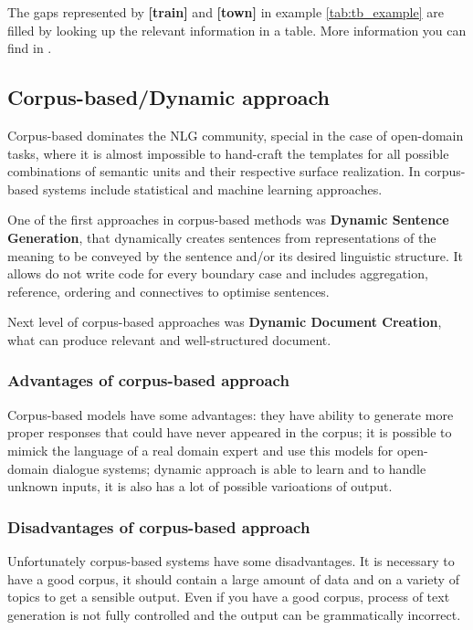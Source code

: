 The gaps represented by \textbf{[train]} and \textbf{[town]} in example \ref{tab:tb_example} are filled by looking up the relevant
information in a table. More information you can find in \cite{applied_nlg}.

\subsection{Corpus-based/Dynamic approach}
Corpus-based dominates the NLG community, special in the case of open-domain tasks, where it is almost impossible to hand-craft the templates for all possible combinations of semantic units and their respective surface realization.
In corpus-based systems include statistical and machine learning approaches. 

One of the first approaches in corpus-based methods was \textbf{Dynamic Sentence Generation}, that dynamically creates sentences from representations of the meaning to be conveyed by the sentence and/or its desired linguistic structure. It allows do not write code for every boundary case and includes aggregation, reference, ordering and connectives to optimise sentences.

Next level of corpus-based approaches was \textbf{Dynamic Document Creation}, what can produce relevant and well-structured document. 

\subsubsection{Advantages of corpus-based approach}
Corpus-based models have some advantages: they have ability to generate more proper responses that could have never appeared in the corpus; it is possible to mimick the language of a real domain expert and use this models for open-domain dialogue systems; dynamic approach is able to learn and to handle unknown inputs, it is also has a lot of possible varioations of output.

\subsubsection{Disadvantages of corpus-based approach}
Unfortunately corpus-based systems have some disadvantages. It is necessary to have a good corpus, it should contain a large amount of data and on a variety of topics to get a sensible output. Even if you have a good corpus, process of text generation is not fully controlled and the output can be grammatically incorrect.

